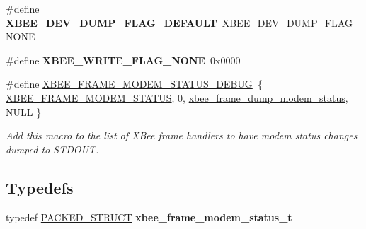 \begin{DoxyCompactItemize}
\#define {\bfseries X\+B\+E\+E\+\_\+\+D\+E\+V\+\_\+\+D\+U\+M\+P\+\_\+\+F\+L\+A\+G\+\_\+\+D\+E\+F\+A\+U\+LT}~X\+B\+E\+E\+\_\+\+D\+E\+V\+\_\+\+D\+U\+M\+P\+\_\+\+F\+L\+A\+G\+\_\+\+N\+O\+NE
\item 
\mbox{\label{group__xbee__device_ga932b739da0b735b4d9ad229b4869cfc3}} 
\#define {\bfseries X\+B\+E\+E\+\_\+\+W\+R\+I\+T\+E\+\_\+\+F\+L\+A\+G\+\_\+\+N\+O\+NE}~0x0000
\item 
\mbox{\label{group__xbee__device_gabeb9dfc3097d684df3fd9284021085f6}} 
\#define \hyperlink{group__xbee__device_gabeb9dfc3097d684df3fd9284021085f6}{X\+B\+E\+E\+\_\+\+F\+R\+A\+M\+E\+\_\+\+M\+O\+D\+E\+M\+\_\+\+S\+T\+A\+T\+U\+S\+\_\+\+D\+E\+B\+UG}~\{ \hyperlink{group__xbee__device_gga7753bbebaf00d6d64942f64b6ae9b7b9adff71d45371cf6b933688c43994b7f81}{X\+B\+E\+E\+\_\+\+F\+R\+A\+M\+E\+\_\+\+M\+O\+D\+E\+M\+\_\+\+S\+T\+A\+T\+US}, 0, \hyperlink{group__xbee__device_gae54cdc832021172ae535a449856450b7}{xbee\+\_\+frame\+\_\+dump\+\_\+modem\+\_\+status}, N\+U\+LL \}
\begin{DoxyCompactList}\small\item\em Add this macro to the list of X\+Bee frame handlers to have modem status changes dumped to S\+T\+D\+O\+UT. \end{DoxyCompactList}\end{DoxyCompactItemize}
\subsection*{Typedefs}
\begin{DoxyCompactItemize}
\item 
typedef \hyperlink{group___s_x_a_ga4233297bd31be5c273d4fb0758cc54d7}{P\+A\+C\+K\+E\+D\+\_\+\+S\+T\+R\+U\+CT} {\bfseries xbee\+\_\+frame\+\_\+modem\+\_\+status\+\_\+t}
\end{DoxyCompactItemize}
